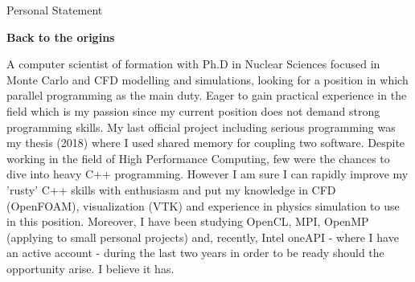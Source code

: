 \documentclass[11pt]{letter}
\begin{document}
\begin{letter}{Personal Statement}

\begin{center}
  \textbf{Back to the origins}
\end{center}

  \bigskip\noindent
  
A computer scientist of formation with Ph.D in Nuclear Sciences focused in Monte Carlo and CFD modelling and simulations, looking for a position in which parallel programming as the main duty. Eager to gain practical experience in the field which is my passion since my current position does not demand strong programming skills. My last official project including serious programming was my thesis (2018) where I used shared memory for coupling two software. Despite working in the field of High Performance Computing, few were the chances to dive into heavy C++ programming. However I am sure I can rapidly improve my 'rusty' C++ skills with enthusiasm and put my knowledge in CFD (OpenFOAM), visualization (VTK) and experience in physics simulation to use in this position. Moreover, I have been studying OpenCL, MPI, OpenMP (applying to small personal projects) and, recently, Intel oneAPI - where I have an active account - during the last two years in order to be ready should the opportunity arise. I believe it has.     
  
\end{letter}
\end{document}
